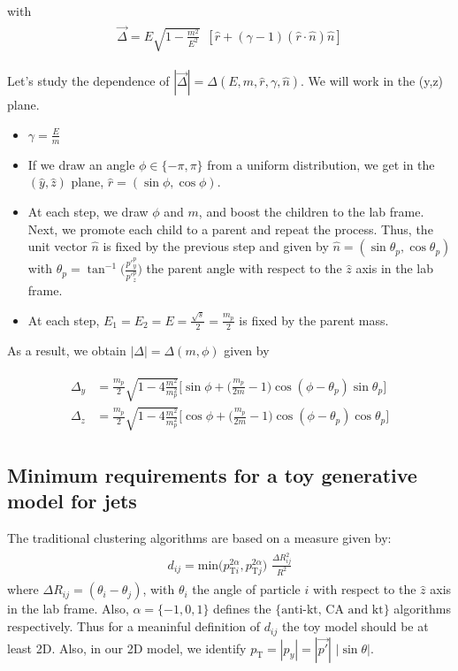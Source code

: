 \documentclass[12pt]{article}
\newcommand{\bea}{\begin{eqnarray}\begin{aligned}}
\newcommand{\eea}{\end{aligned}\end{eqnarray}}
\begin{document}
with
\bea\label{eq:delta}
 \vec{\Delta}   = E \sqrt{1-\frac{m^2}{E^2}} \,\,\,[ \hat{r} + (\gamma -1) (\hat{r} \cdot \hat{n}) \hat{n} ] 
\eea

Let's study the dependence of $|\vec{\Delta}|=\Delta(E,m,\hat{r},\gamma,\hat{n})$. We will work in the (y,z) plane.

\begin{itemize}
\item $\gamma=\frac{E}{m}$
\item If we draw an angle $\phi \in \{-\pi,\pi\}$ from a uniform distribution, we get in the $(\hat{y},\hat{z})$ plane,  $\hat{r}= (\sin{\phi}, \cos{\phi})$.

\item At each step, we draw $\phi$ and $m$, and boost the children to the lab frame. Next, we promote each child to a parent and repeat the process. Thus, the unit vector $\hat{n}$ is fixed by the previous step and given by $\hat{n}=(\sin{\theta_p}, \cos{\theta_p})$ with $\theta_p=\tan^{-1}\bigg({\frac{p'^{p}_y}{p'^{p}_z}}\bigg)$ the parent angle with respect to the $\hat{z}$ axis in the lab frame. 

\item At each step, $E_1=E_2=E =\frac{\sqrt{s}}{2}= \frac{m_p}{2}$ is fixed by the parent mass.

\end{itemize}

As a result, we obtain $|\Delta|=\Delta(m,\phi)$ given by

\bea
 \Delta_y   &= \frac{m_p}{2} \sqrt{1- 4\frac{m^2}{m_p^2}}  \bigg[ \sin{\phi} + \bigg(\frac{m_p}{ 2 m}-1\bigg) \cos{(\phi-\theta_p)} \sin{\theta_p} \bigg]\\ 
  \Delta_z   &= \frac{m_p}{2} \sqrt{1- 4\frac{m^2}{m_p^2}}   \bigg[\cos{\phi} +  \bigg(\frac{m_p}{2 m}-1\bigg) \cos{(\phi-\theta_p)} \cos{\theta_p} \bigg]
\eea




\subsection{Minimum requirements for a toy generative model for jets}

The traditional clustering algorithms are based on a measure given by:
\bea
d_{ij}= \text{min}({p_{\text{T}i}^{2\alpha}, {p_{\text{T}j}^{2\alpha}})\,\, \frac{\Delta R_{ij}^2}{R^2}}
\eea
where $\Delta R_{ij}=(\theta_i-\theta_j)$, with $\theta_i$ the angle of particle $i$ with respect to the $\hat{z}$ axis in the lab frame. Also, $\alpha=\{-1,0,1\}$ defines the $\{\text{anti-kt, CA and kt}\}$ algorithms respectively. Thus for a meaninful definition of $d_{ij}$ the toy model should be at least 2D. Also, in our 2D model, we identify $p_{\text{T}}=|p_y| = |\vec{p'}| \,\,  |\sin{\theta}|$.
\end{document}

